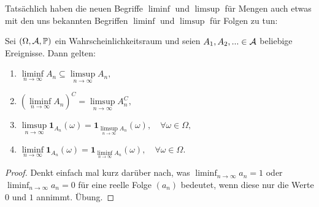 Tats\"achlich haben die neuen Begriffe $\liminf$ und $\limsup$ f\"ur Mengen auch etwas mit den uns bekannten Begriffen $\liminf$ und $\limsup$ f\"ur Folgen zu tun:
\begin{lemma}
	Sei $(\Omega, \mathcal{A}, \mathbb{P})$ ein Wahrscheinlichkeitsraum und seien $A_1,A_2,... \in \mathcal{A}$ beliebige Ereignisse. Dann gelten:
	\begin{enumerate}[label=(\roman*)]
		\item $ \liminf\limits_{n \to \infty} A_n \subseteq \limsup\limits_{n \to \infty} A_n,$
		\item $(\liminf\limits_{n \to \infty} A_n)^C = \limsup\limits_{n \to \infty} A_n^C,$
		\item $\limsup\limits_{n \to \infty} \mathbf{1}_{A_n}(\omega) = \mathbf{1}_{\limsup\limits_{n \to \infty} A_n}(\omega),\quad \forall \omega \in \Omega,$
		\item $\liminf\limits_{n \to \infty} \mathbf{1}_{A_n}(\omega) = \mathbf{1}_{\liminf\limits_{n \to \infty} A_n}(\omega),\quad \forall \omega \in \Omega.$
	\end{enumerate}
\end{lemma}

\begin{proof}
	Denkt einfach mal kurz dar\"uber nach, was $\liminf_{n\to\infty} a_n=1$ oder $\liminf_{n\to\infty} a_n=0$ f\"ur eine reelle Folge $(a_n)$ bedeutet, wenn diese nur die Werte $0$ und $1$ annimmt. \"Ubung.
\end{proof}

